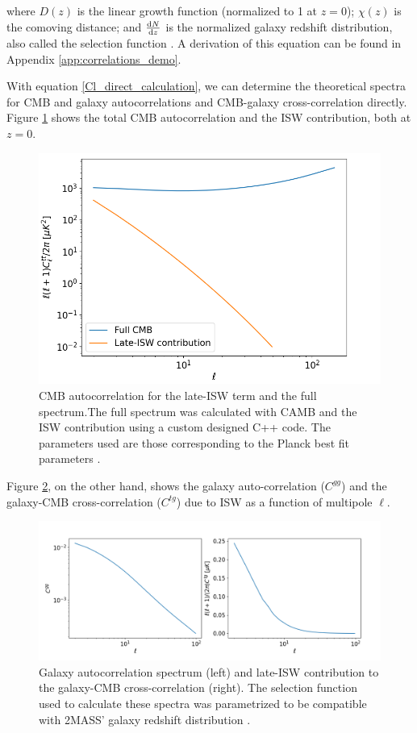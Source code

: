 \documentclass[openany,a4paper,12pt,oneside]{book}
\begin{document}
\begin{spacing}{1.5}
\noindent where $D(z)$ is the linear growth function (normalized to 1 at $z=0$); $\chi(z)$ is the comoving distance; and $\dv{N}{z}$ is the normalized galaxy redshift distribution, also called the selection function \cite{cross_corr:Afshordi}. A derivation of this equation can be found in Appendix \ref{app:correlations_demo}.

With equation \eqref{Cl_direct_calculation}, we can determine the theoretical spectra for CMB and galaxy autocorrelations and CMB-galaxy cross-correlation directly. Figure \ref{fig:Ctt_ISW_comparison} shows the total CMB autocorrelation and the ISW contribution, both at $z=0$.

\begin{figure}[!htb]
    \centering
    \includegraphics[width=.75\linewidth]{Imagens/Ctt_comparison.png}
	\caption{CMB autocorrelation for the late-ISW term and the full spectrum.The full spectrum was calculated with CAMB and the ISW contribution using a custom designed C++ code. The parameters used are those corresponding to the Planck best fit parameters \cite{Planck_results}.}
    \label{fig:Ctt_ISW_comparison}
\end{figure}

Figure \ref{fig:correlations_theoretical}, on the other hand, shows the galaxy auto-correlation ($C^{gg}$) and the galaxy-CMB cross-correlation ($C^{tg}$) due to ISW as a function of multipole $\ell$.

\begin{figure}[!htb]
	\centering
	\includegraphics[width=.98\linewidth]{Imagens/Correlations_DoublePlot.png}
	\caption{Galaxy autocorrelation spectrum (left) and late-ISW contribution to the galaxy-CMB cross-correlation (right). The selection function used to calculate these spectra was parametrized to be compatible with 2MASS' galaxy redshift distribution \cite{cross_corr:Afshordi, Moura-Santos_2016}.}
	\label{fig:correlations_theoretical}
\end{figure}


\end{spacing}
\end{document}

